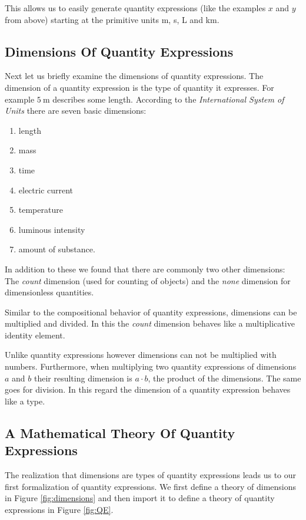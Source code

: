 This allows us to easily generate quantity expressions (like the examples $x$ and $y$ from above) starting at the primitive units m, s, L and km.

\subsection{Dimensions Of Quantity Expressions}
Next let us briefly examine the dimensions of quantity expressions. The dimension of a quantity expression is the type of quantity it expresses. For example $5\ \text{m}$ describes some length. According to the \textit{International System of Units} \cite{sispec} there are seven basic dimensions:
\begin{enumerate}
  \item length
  \item mass
  \item time
  \item electric current
  \item temperature
  \item luminous intensity
  \item amount of substance.
\end{enumerate}

In addition to these we found that there are commonly two other dimensions: The \textit{count} dimension (used for counting of objects) and the \textit{none} dimension for dimensionless quantities.

Similar to the compositional behavior of quantity expressions, dimensions can be multiplied and divided. In this the \textit{count} dimension behaves like a multiplicative identity element.

Unlike quantity expressions however dimensions can not be multiplied with numbers. Furthermore, when multiplying two quantity expressions of dimensions $a$ and $b$ their resulting dimension is $a \cdot{} b$, the product of the dimensions. The same goes for division. In this regard the dimension of a quantity expression behaves like a type.

\subsection{A Mathematical Theory Of Quantity Expressions}
\label{sec:qeform}

The realization that dimensions are types of quantity expressions leads us to our first formalization of quantity expressions. We first define a theory of dimensions in Figure \ref{fig:dimensions} and then import it to define a theory of quantity expressions in Figure \ref{fig:QE}.


